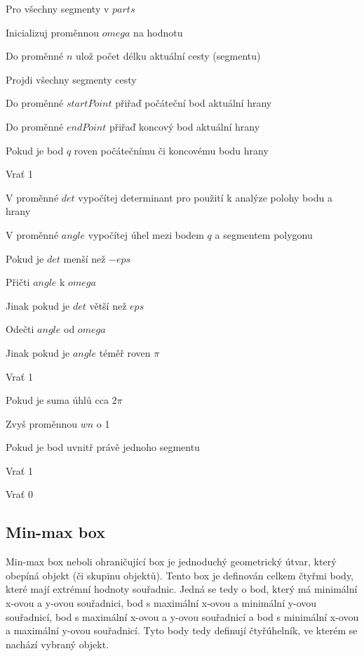 \documentclass{article}
\begin{document}
\begin{spacing}{1.5}
\noindent Pro všechny segmenty v $parts$

\indent Inicializuj proměnnou $omega$ na hodnotu

\indent Do proměnné $n$ ulož počet délku aktuální cesty (segmentu)

\indent Projdi všechny segmenty cesty

\indent \indent Do proměnné $startPoint$ přiřaď počáteční bod aktuální hrany

\indent\indent Do proměnné $endPoint$ přiřaď koncový bod aktuální hrany

\indent\indent Pokud je bod $q$ roven počátečnímu či koncovému bodu hrany

\indent\indent\indent Vrať 1

\indent\indent V proměnné $det$ vypočítej determinant pro použití k analýze polohy bodu a hrany

\indent\indent V proměnné $angle$ vypočítej úhel mezi bodem $q$ a segmentem polygonu

\indent\indent\indent Pokud je $det$ menší než $-eps$ 

\indent\indent\indent\indent Přičti $angle$ k $omega$

\indent\indent\indent Jinak pokud je $det$ větší než $eps$

\indent\indent\indent\indent Odečti $angle$ od $omega$

\indent\indent\indent Jinak pokud je $angle$ téměř roven $\pi$

\indent\indent\indent\indent Vrať 1	

\indent Pokud je suma úhlů cca $2\pi$

\indent\indent Zvyš proměnnou $wn$ o 1

\noindent Pokud je bod uvnitř právě jednoho segmentu

\indent Vrať 1

\noindent Vrať 0


\subsection{Min-max box}
Min-max box neboli ohraničující box je jednoduchý geometrický útvar, který obepíná objekt (či skupinu objektů). Tento box je definován celkem čtyřmi body, které mají extrémní hodnoty souřadnic. Jedná se tedy o bod, který má minimální x-ovou a y-ovou souřadnici, bod s maximální x-ovou a minimální y-ovou souřadnicí, bod s maximální x-ovou a y-ovou souřadnicí a bod s minimální x-ovou a maximální y-ovou souřadnicí. Tyto body tedy definují čtyřúhelník, ve kterém se nachází vybraný objekt. 


\end{spacing}
\end{document}
